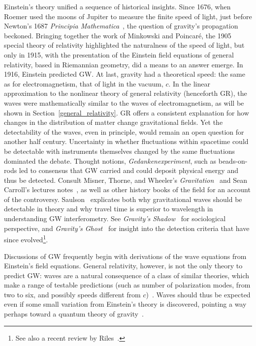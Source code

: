        Einstein's theory unified a sequence of historical insights. 
Since 1676, when Roemer used the moons of Jupiter to measure the finite speed of light, just before Newton's 1687 \textit{Principia Mathematica}~\cite{Hawking2002}, the question of gravity's propagation beckoned. 
Bringing together the work of Minkowski and Poincar\'{e}, the 1905 special theory of relativity highlighted the naturalness of the speed of light, but only in 1915, with the presentation of the Einstein field equations of general relativity, based in Riemannian geometry, did a means to an answer emerge. 
In 1916, Einstein predicted GW. 
At last, gravity had a theoretical speed: the same as for electromagnetism, that of light in the vacuum, $c$.
In the linear approximation to the nonlinear theory of general relativity (henceforth GR), the waves were mathematically similar to the waves of electromagnetism, as will be shown in Section~\ref{general_relativity}.
GR offers a consistent explanation for how changes in the distribution of matter change gravitational fields.
Yet the detectability of the waves, even in principle, would remain an open question for another half century. 
Uncertainty in whether fluctuations within spacetime could be detectable with instruments themselves changed by the same fluctuations dominated the debate. %
Thought notions, \textit{Gedankenexperiment}, such as beads-on-rods led to consensus that GW carried and could deposit physical energy and thus be detected. 
Consult Misner, Thorne, and Wheeler's \textit{Gravitation}~\cite{MisnerThorneWheeler} and Sean Carroll's lectures notes~\cite{Carroll1997}, as well as other history books of the field for an account of the controversy.
Saulson~\cite{Saulson1997} explicates both why gravitational waves should be detectable in theory and why travel time is superior to wavelength in understanding GW interferometry.
See \textit{Gravity's Shadow}~\cite{CollinsGravityShadow} for sociological perspective, and 
\textit{Gravity's Ghost}~\cite{CollinsGravityGhost} for insight into the detection criteria that have since evolved\footnote{See also a recent review by Riles~\cite{Riles2013}.}.

Discussions of GW frequently begin with derivations of the wave equations from Einstein's field equations. 
General relativity, however, is not the only theory to predict GW: waves are a natural consequence of a class of similar theories, which make a range of testable predictions (such as number of polarization modes, from two to six, and possibly speeds different from $c$)~\cite{Will1993}. 
Waves should thus be expected even if some small variation from Einstein's theory is discovered, pointing a way perhaps toward a quantum theory of gravity~\cite{Sathyaprakash2009}. 

